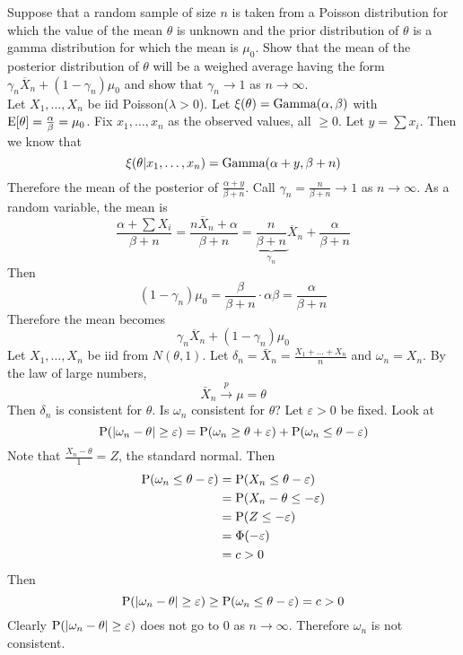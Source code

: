 \documentclass[12pt]{article}
\begin{document}
Suppose that a random sample of size $n$ is taken from a Poisson distribution for which the value of the mean $\theta$ is unknown and the prior distribution of $\theta$ is a gamma distribution for which the mean is $\mu_0$. Show that the mean of the posterior distribution of $\theta$ will be a weighed average having the form $\gamma_n\overline{X}_n + (1-\gamma_n)\mu_0$ and show that $\gamma_n \to 1$ as $n \to \infty$. \\
Let $X_1,\dots,X_n$ be iid Poisson($\lambda > 0$). Let $\xi(\theta) = \text{Gamma}( \alpha,\beta )$ with $\mathrm{E}[ \theta ] = \frac{\alpha}{\beta} = \mu_0$. Fix $x_1,\dots,x_n$ as the observed values, all $\geq0$. Let $y = \sum x_i$. Then we know that $$\xi(\theta|x_1,\dots,x_n) = \text{Gamma}( \alpha+y, \beta+n )$$
Therefore the mean of the posterior of $\frac{\alpha + y}{\beta + n}$. Call $\gamma_n = \frac{n}{\beta + n} \to 1$ as $n\to\infty$. 
  As a random variable, the mean is $$
  \frac{\alpha + \sum X_i}{\beta + n} = \frac{n\overline{X}_n + \alpha}{\beta + n} = \underbrace{\frac{n}{\beta + n}}_{\gamma_n}\overline{X}_n + \frac{\alpha}{\beta + n}$$ 
  Then $$(1-\gamma_n)\mu_0 = \frac{\beta}{\beta+n} \cdot \alpha{\beta} = \frac{\alpha}{\beta+n}$$ Therefore the mean becomes $$\gamma_n\overline{X}_n + (1-\gamma_n)\mu_0$$ 
 Let $X_1,\dots,X_n$ be iid from $N(\theta, 1)$. Let $\delta_n = \bar{X}_n = \frac{X_1+\dots+X_n}{n}$ and $\omega_n = X_n$. By the law of large numbers, $$\bar{X}_n \stackrel{p}{\to} \mu = \theta$$ Then $\delta_n$ is consistent for $\theta$. Is $\omega_n$ consistent for $\theta$? Let $\varepsilon > 0$ be fixed. Look at 
 $$ \mathrm{P}( \abs{\omega_n - \theta} \geq \varepsilon ) = \mathrm{P}( \omega_n \geq \theta + \varepsilon ) + \mathrm{P}( \omega_n \leq \theta - \varepsilon ) $$ 
 Note that $\frac{X_n - \theta}{1} = Z$, the standard normal. Then $$ \begin{aligned} \mathrm{P}( \omega_n \leq \theta - \varepsilon ) &= \mathrm{P}( X_n \leq \theta - \varepsilon ) \\ &= \mathrm{P}( X_n - \theta \leq - \varepsilon ) \\ &= \mathrm{P}( Z \leq -\varepsilon ) \\ &= \Phi(-\varepsilon) \\ &= c > 0 \end{aligned} $$ 
 Then $$\mathrm{P}( \abs{\omega_n - \theta} \geq \varepsilon ) \geq \mathrm{P}( \omega_n \leq \theta - \varepsilon ) = c > 0 $$ Clearly $\mathrm{P}( \abs{\omega_n - \theta} \geq \varepsilon )$ does not go to $0$ as $n\to \infty$. Therefore $\omega_n$ is not consistent. 
 
  
\end{document}
